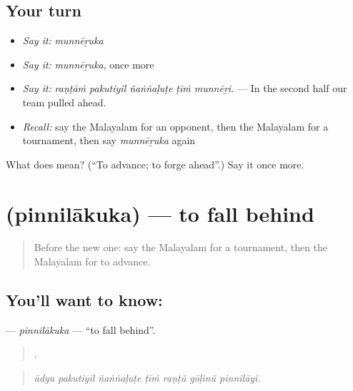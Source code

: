 \subsection*{Your turn}
\begin{itemize}
\raggedright
  \item \emph{Say it:} \emph{munnēṟuka}
  \item \emph{Say it:} \emph{munnēṟuka}, once more
  \item \emph{Say it:} \emph{raṇṭāṁ pakutiyil ñaṅṅaḷuṭe ṭīṁ munnēṟi.} — In the second half our team pulled ahead.
  \item \emph{Recall:} say the Malayalam for an opponent, then the Malayalam for a tournament, then say \emph{munnēṟuka} again
\end{itemize}

\begin{tcolorbox}[breakable,colback=teal!4,colframe=teal!35!black,title={Before you move on}]
What does  mean? (\textquotedblleft{}To advance; to forge ahead\textquotedblright{}.) Say it once more.
\end{tcolorbox}
\section[\texorpdfstring{\ml{പിന്നിലാകുക} (pinnilākuka)}{പിന്നിലാകുക (pinnilākuka)}]{ (pinnilākuka) — to fall behind}

\label{lesson:ML-C569-pinnilakuka}



\begin{quote}
Before the new one: say the Malayalam for a tournament, then the Malayalam for to advance.
\end{quote}

\subsection*{You'll want to know: }
\textbf{} — \emph{pinnilākuka} — \textquotedblleft{}to fall behind\textquotedblright{}.

\begin{quote}
      .
\end{quote}

\begin{quote}
\emph{ādya pakutiyil ñaṅṅaḷuṭe ṭīṁ raṇṭŭ gōḷinŭ pinnilāyi.}
\end{quote}

